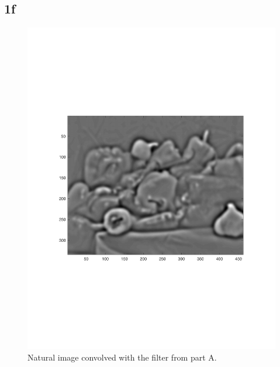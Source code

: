 \documentclass[]{article}
\begin{document}
\subsection*{1f}
\begin{figure}[H]
    \centering
    \includegraphics{problem1FfilterA.pdf}
    \caption{Natural image convolved with the filter from part A.}
    \label{fig:my_label}
\end{figure}
\end{document}
